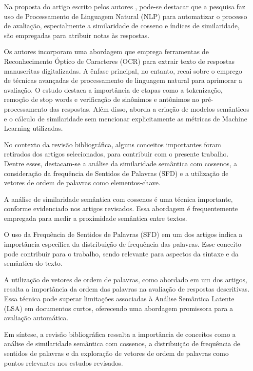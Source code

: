 Na proposta do artigo escrito pelos autores \cite{SemanticSimilarityBasedDescriptiveAnswerEvaluation}, pode-se destacar que a pesquisa faz uso de Processamento de Linguagem Natural (NLP) para automatizar o processo de avaliação, especialmente a similaridade de cosseno e índices de similaridade, são empregadas para atribuir notas às respostas.
    
Os autores \cite{StudyAutomatedEvaluationStudentsExaminationPaperMachineLearningTechniques} incorporam uma abordagem que emprega ferramentas de Reconhecimento Óptico de Caracteres (OCR) para extrair texto de respostas manuscritas digitalizadas. A ênfase principal, no entanto, recai sobre o emprego de técnicas avançadas de processamento de linguagem natural para aprimorar a avaliação. O estudo destaca a importância de etapas como a tokenização, remoção de stop words e verificação de sinônimos e antônimos no pré-processamento das respostas. Além disso, aborda a criação de modelos semânticos e o cálculo de similaridade sem mencionar explicitamente as métricas de Machine Learning utilizadas.



No contexto da revisão bibliográfica, alguns conceitos importantes foram retirados dos artigos selecionados, para contribuir com o presente trabalho. Dentre esses, destacam-se a análise da similaridade semântica com cossenos, a consideração da frequência de Sentidos de Palavras (SFD) e a utilização de vetores de ordem de palavras como elementos-chave.

A análise de similaridade semântica com cossenos é uma técnica importante, conforme evidenciado nos artigos revisados. Essa abordagem é frequentemente empregada para medir a proximidade semântica entre textos.

O uso da Frequência de Sentidos de Palavras (SFD) em um dos artigos indica a importância específica da distribuição de frequência das palavras. Esse conceito pode contribuir para o trabalho, sendo relevante para aspectos da sintaxe e da semântica do texto.

A utilização de vetores de ordem de palavras, como abordado em um dos artigos, resalta a importância da ordem das palavras na avaliação de respostas descritivas. Essa técnica pode superar limitações associadas à Análise Semântica Latente (LSA) em documentos curtos, oferecendo uma abordagem promissora para a avaliação automática.

Em síntese, a revisão bibliográfica ressalta a importância de conceitos como a análise de similaridade semântica com cossenos, a distribuição de frequência de sentidos de palavras e da exploração de vetores de ordem de palavras como pontos relevantes nos estudos revisados.

\newpage